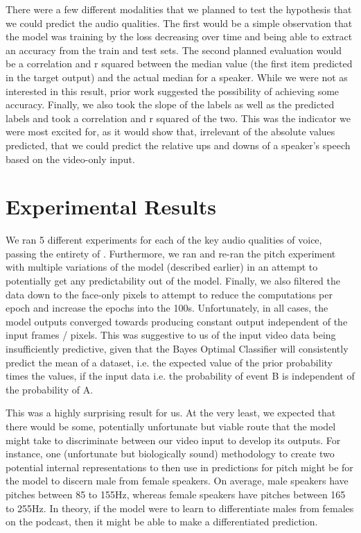 \documentclass[10pt,twocolumn,letterpaper]{article}
\begin{document}
There were a few different modalities that we planned to test the hypothesis that we could predict the audio qualities. The first would be a simple observation that the model was training by the loss decreasing over time and being able to extract an accuracy from the train and test sets. The second planned evaluation would be a correlation and r squared between the median value (the first item predicted in the target output) and the actual median for a speaker. While we were not as interested in this result, prior work suggested the possibility of achieving some accuracy. Finally, we also took the slope of the labels as well as the predicted labels and took a correlation and r squared of the two. This was the indicator we were most excited for, as it would show that, irrelevant of the absolute values predicted, that we could predict the relative ups and downs of a speaker's speech based on the video-only input.

\section{Experimental Results}
\label{sec:results}

We ran 5 different experiments for each of the key audio qualities of voice, passing the entirety of . Furthermore, we ran and re-ran the pitch experiment with multiple variations of the model (described earlier) in an attempt to potentially get any predictability out of the model. Finally, we also filtered the data down to the face-only pixels to attempt to reduce the computations per epoch and increase the epochs into the 100s. Unfortunately, in all cases, the model outputs converged towards producing constant output independent of the input frames / pixels. This was suggestive to us of the input video data being insufficiently predictive, given that the Bayes Optimal Classifier will consistently predict the mean of a dataset, i.e. the expected value of the prior probability times the values, if the input data i.e. the probability of event B is independent of the probability of A.

This was a highly surprising result for us. At the very least, we expected that there would be some, potentially unfortunate but viable route that the model might take to discriminate between our video input to develop its outputs. For instance, one (unfortunate but biologically sound) methodology to create two potential internal representations to then use in predictions for pitch might be for the model to discern male from female speakers. On average, male speakers have pitches between 85 to 155Hz, whereas female speakers have pitches between 165 to 255Hz\cite{Fitch1970}. In theory, if the model were to learn to differentiate males from females on the podcast, then it might be able to make a differentiated prediction.
\end{document}
